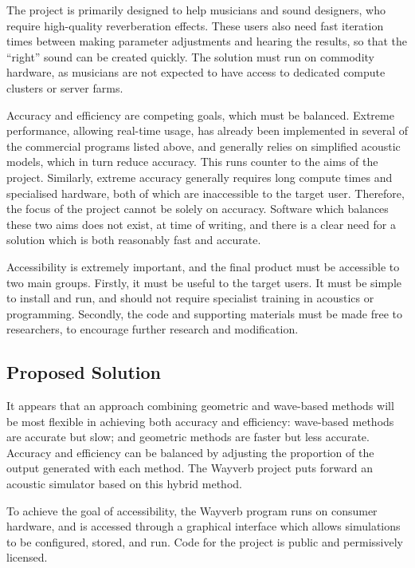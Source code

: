 \documentclass[]{scrreprt}
\begin{document}
The project is primarily designed to help musicians and sound designers,
who require high-quality reverberation effects. These users also need
fast iteration times between making parameter adjustments and hearing
the results, so that the ``right'' sound can be created quickly. The
solution must run on commodity hardware, as musicians are not expected
to have access to dedicated compute clusters or server farms.

Accuracy and efficiency are competing goals, which must be balanced.
Extreme performance, allowing real-time usage, has already been
implemented in several of the commercial programs listed above, and
generally relies on simplified acoustic models, which in turn reduce
accuracy. This runs counter to the aims of the project. Similarly,
extreme accuracy generally requires long compute times and specialised
hardware, both of which are inaccessible to the target user. Therefore,
the focus of the project cannot be solely on accuracy. Software which
balances these two aims does not exist, at time of writing, and there is
a clear need for a solution which is both reasonably fast and accurate.

Accessibility is extremely important, and the final product must be
accessible to two main groups. Firstly, it must be useful to the target
users. It must be simple to install and run, and should not require
specialist training in acoustics or programming. Secondly, the code and
supporting materials must be made free to researchers, to encourage
further research and modification.

\subsection{Proposed Solution}\label{proposed-solution}

It appears that an approach combining geometric and wave-based methods
will be most flexible in achieving both accuracy and efficiency:
wave-based methods are accurate but slow; and geometric methods are
faster but less accurate. Accuracy and efficiency can be balanced by
adjusting the proportion of the output generated with each method. The
Wayverb project puts forward an acoustic simulator based on this hybrid
method.

To achieve the goal of accessibility, the Wayverb program runs on
consumer hardware, and is accessed through a graphical interface which
allows simulations to be configured, stored, and run. Code for the
project is public and permissively licensed.
\end{document}
